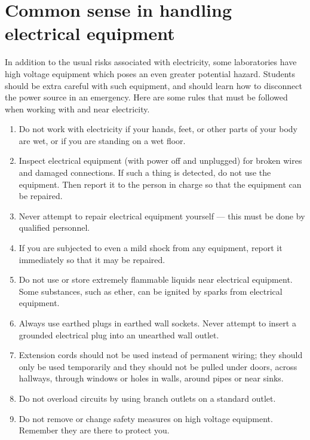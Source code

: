 \documentclass[../Elmag-labhefte-2020.tex]{subfiles}
\begin{document}
\section{Common sense in handling electrical equipment}

In addition to the usual risks associated with electricity, some laboratories have high voltage equipment  which poses an even greater potential hazard. Students should be extra careful with such equipment, and should learn how to disconnect the power source in an emergency. Here are some rules that must be followed when working with and near electricity.

\begin{enumerate}
    \item Do not work with electricity if your hands, feet, or other parts of your body are wet, or if you are standing on a wet floor.
    \item Inspect electrical equipment (with power off and unplugged) for broken wires and damaged connections. If such a thing is detected, do not use the equipment. Then report it to the person in charge so that the equipment can be repaired.
    \item Never attempt to repair electrical equipment yourself --- this must be done by qualified personnel.
    \item If you are subjected to even a mild shock from any equipment, report it immediately so that it may be repaired.
    \item Do not use or store extremely flammable liquids near electrical equipment. Some substances, such as ether, can be ignited by sparks from electrical equipment.
    \item Always use earthed plugs in earthed wall sockets. Never attempt to insert a grounded electrical plug into an unearthed wall outlet.
    \item Extension cords should not be used instead of permanent wiring; they should only be used temporarily and they should not be pulled under doors, across hallways, through windows or holes in walls, around pipes or near sinks.
    \item Do not overload circuits by using branch outlets on a standard outlet.
    \item Do not remove or change safety measures on high voltage equipment. Remember they are there to protect you.

\end{enumerate}
\end{document}
